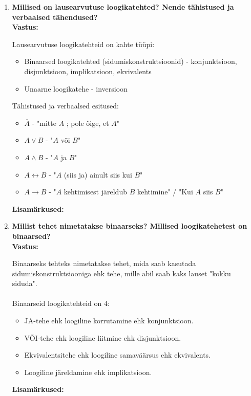 \documentclass[a4paper,12pt]{article}
\makeatletter
\newenvironment{question}[1]{%
  \item \textbf{#1} \vspace{0.5em} \\ %
  \textbf{Vastus:} \vspace{0.25em} \\ %
  \def\@lisamarkused{} %
}{%
  \if\relax\detokenize\expandafter{\@lisamarkused}\relax %
  \else
    \vspace{0.5em} %
    \textbf{Lisamärkused:} \\ %
    \@lisamarkused %
  \fi
  \vspace{1em} %
}
\makeatother
\begin{document}
\begin{enumerate}[left=0pt]
\begin{question}{Millised on lausearvutuse loogikatehted? Nende tähistused ja verbaalsed tähendused?}
  Lausearvutuse loogikatehteid on kahte tüüpi:
  \begin{itemize}
    \item Binaarsed loogikatehted (sidumiskonstruktsioonid) - konjunktsioon,\\ disjunktsioon, implikatsioon, ekvivalents  
    \item Unaarne loogikatehe - inversioon
  \end{itemize}
  Tähistused ja verbaalsed esitused:  
  \begin{itemize}
    \item $\overline{A}$ - "mitte ${A}$ ; pole õige, et ${A}$"
    \item ${A} \vee {B}$ - "${A}$ või ${B}$"
    \item ${A} \wedge {B}$ - "${A}$ ja ${B}$"
    \item ${A} \leftrightarrow {B}$ - "${A}$ (siis ja) ainult siis kui ${B}$"
    \item ${A} \rightarrow {B}$ - "${A}$ kehtimisest järeldub ${B}$ kehtimine" / "Kui ${A}$ siis  ${B}$"  
  \end{itemize}
\end{question}

\begin{question}{Millist tehet nimetatakse binaarseks? Millised loogikatehetest on binaarsed?}
  Binaarseks tehteks nimetatakse tehet, mida saab kasutada sidumiskonstruktsiooniga ehk tehe, mille abil saab kaks lauset "kokku siduda". \\
  \\ Binaarseid loogikatehteid on $4$:
  \begin{itemize}
    \item JA-tehe ehk loogiline korrutamine ehk konjunktsioon. 
    \item VÕI-tehe ehk loogiline liitmine ehk disjunktsioon. 
    \item Ekvivalentsitehe ehk loogiline samaväärsus ehk ekvivalents. 
    \item Loogiline järeldamine ehk implikatsioon.
  \end{itemize}
\end{question}


\end{enumerate}
\end{document}
